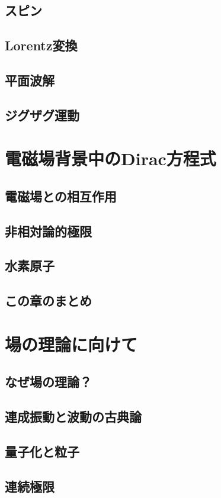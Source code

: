 \documentclass[report,paper=a4, fontsize=12pt, line_length=16cm, number_of_lines=33,dvipdfmx]{jlreq}
\numberwithin{equation}{chapter}
\begin{document}
\section{スピン}
\section{Lorentz変換}
\section{平面波解}
\section{ジグザグ運動}



\chapter{電磁場背景中のDirac方程式}
\section{電磁場との相互作用}
\section{非相対論的極限}
\section{水素原子}
\section{この章のまとめ}



\chapter{場の理論に向けて}
\section{なぜ場の理論？}
\section{連成振動と波動の古典論}
\section{量子化と粒子}
\section{連続極限}
\end{document}
